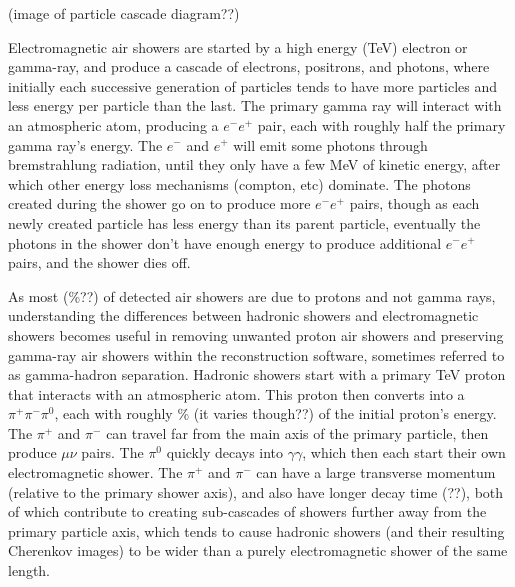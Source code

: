 (image of particle cascade diagram??)

Electromagnetic air showers are started by a high energy (\nicetilde TeV) electron or gamma-ray, and produce a cascade of electrons, positrons, and photons, where initially each successive generation of particles tends to have more particles and less energy per particle than the last.
The primary gamma ray will interact with an atmospheric atom, producing a $e^{-}e^{+}$ pair, each with roughly half the primary gamma ray's energy.
The $e^{-}$ and $e^{+}$ will emit some photons through bremstrahlung radiation, until they only have a few MeV of kinetic energy, after which other energy loss mechanisms (compton, etc) dominate.
The photons created during the shower go on to produce more $e^{-}e^{+}$ pairs, though as each newly created particle has less energy than its parent particle, eventually the photons in the shower don't have enough energy to produce additional $e^{-}e^{+}$ pairs, and the shower dies off.

As most (\%??) of detected air showers are due to protons and not gamma rays, understanding the differences between hadronic showers and electromagnetic showers becomes useful in removing unwanted proton air showers and preserving gamma-ray air showers within the reconstruction software, sometimes referred to as gamma-hadron separation.
Hadronic showers start with a primary \nicetilde TeV proton that interacts with an atmospheric atom.
This proton then converts into a $\pi^{+}\pi^{-}\pi^{0}$, each with roughly \% (it varies though??) of the initial proton's energy.
The $\pi^{+}$ and $\pi^{-}$ can travel far from the main axis of the primary particle, then produce $\mu\nu$ pairs.
The $\pi^{0}$ quickly decays into $\gamma\gamma$, which then each start their own electromagnetic shower.
The $\pi^{+}$ and $\pi^{-}$ can have a large transverse momentum (relative to the primary shower axis), and also have longer decay time (??), both of which contribute to creating sub-cascades of showers further away from the primary particle axis, which tends to cause hadronic showers (and their resulting Cherenkov images) to be wider than a purely electromagnetic shower of the same length. 

